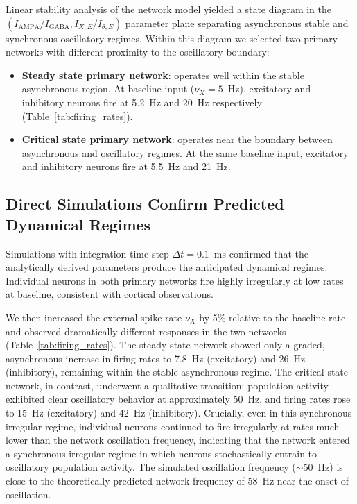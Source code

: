 \documentclass[10pt]{article}
\begin{document}
Linear stability analysis of the network model yielded a state diagram in the
$(I_{\text{AMPA}}/I_{\text{GABA}}, I_{X,E}/I_{\theta,E})$ parameter plane
separating asynchronous stable and synchronous oscillatory regimes. Within
this diagram we selected two primary networks with different proximity to
the oscillatory boundary:

\begin{itemize}
  \item \textbf{Steady state primary network}: operates well within the
    stable asynchronous region. At baseline input ($\nu_X = 5$~Hz),
    excitatory and inhibitory neurons fire at 5.2~Hz and 20~Hz respectively
    (Table~\ref{tab:firing_rates}).
  \item \textbf{Critical state primary network}: operates near the
    boundary between asynchronous and oscillatory regimes. At the same
    baseline input, excitatory and inhibitory neurons fire at 5.5~Hz and
    21~Hz.
\end{itemize}

\subsection{Direct Simulations Confirm Predicted Dynamical Regimes}

Simulations with integration time step $\Delta t = 0.1$~ms confirmed that
the analytically derived parameters produce the anticipated dynamical
regimes. Individual neurons in both primary networks fire highly irregularly
at low rates at baseline, consistent with cortical observations.

We then increased the external spike rate $\nu_X$ by 5\% relative to the
baseline rate and observed dramatically different responses in the two
networks (Table~\ref{tab:firing_rates}). The steady state network showed
only a graded, asynchronous increase in firing rates to 7.8~Hz (excitatory)
and 26~Hz (inhibitory), remaining within the stable asynchronous regime. The
critical state network, in contrast, underwent a qualitative transition:
population activity exhibited clear oscillatory behavior at approximately
50~Hz, and firing rates rose to 15~Hz (excitatory) and 42~Hz (inhibitory).
Crucially, even in this synchronous irregular regime, individual neurons
continued to fire irregularly at rates much lower than the network oscillation
frequency, indicating that the network entered a synchronous irregular regime
in which neurons stochastically entrain to oscillatory population activity.
The simulated oscillation frequency ($\sim$50~Hz) is close to the
theoretically predicted network frequency of 58~Hz near the onset of
oscillation.
\end{document}
